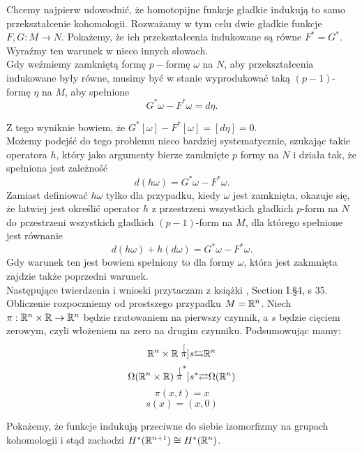 \documentclass[licencjacka]{pracamgr}
\theoremstyle{definition}
\theoremstyle{definition}
\theoremstyle{plain}
\theoremstyle{plain}
\theoremstyle{plain}
\def\R{\ensuremath\mathbb{R}}
\begin{document}
Chcemy najpierw udowodnić, że homotopijne funkcje gładkie indukują to samo
przekształcenie kohomologii.  Rozważamy w tym celu dwie gładkie funkcje $F, G:
M \rightarrow N$.  Pokażemy, że ich przekształcenia indukowane są równe
$F^\ast = G^\ast$. Wyraźmy ten warunek w nieco innych słowach. \\

Gdy weźmiemy zamkniętą formę $p-$formę $\omega$ na $N$, aby
przekształcenia indukowane były równe, musimy być w stanie
wyprodukować taką $(p-1)$-formę $\eta$ na $M$, aby spełnione
\[
    G^\ast \omega - F^\ast \omega = d\eta.
\]

Z tego wyniknie bowiem, że
$ G^\ast [\omega] - F^\ast [\omega] =
[d\eta] = 0$. \\

Możemy podejść do tego problemu nieco bardziej systematycznie, 
szukając takie operatora
$h$, który jako argumenty bierze zamknięte $p$ formy na $N$
i działa tak, że spełniona jest zależność
\[
    d(h\omega) = G^\ast \omega - F^\ast \omega.
\] 
Zamiast definiować $h \omega$ tylko dla przypadku, kiedy $\omega$
jest zamknięta, okazuje się, że łatwiej jest określić operator
$h$ z przestrzeni wszystkich gładkich $p$-form na $N$
do przestrzeni wszystkich gładkich $(p-1)$-form na $M$,
dla którego spełnione jest równanie
\[
    d(h\omega) + h(d\omega) = G^\ast \omega - F^\ast \omega.
\]
Gdy warunek ten jest bowiem spełniony to dla formy $\omega$, która
jest zakmnięta zajdzie także poprzedni warunek. \\

Następujące twierdzenia i wnioski przytaczam z książki \cite{bott}, Section
I.\S4, s 35. \\

Obliczenie rozpoczniemy od prostszego przypadku $M = \R^n$.
Niech $\pi: \R^n \times \R \rightarrow \R^n$  będzie rzutowaniem
na pierwszy czynnik, a $s$  będzie cięciem zerowym, czyli włożeniem
na zero na drugim czynniku. Podsumowując mamy:
\[
 \R^n \times \R
 \stackrel[\pi]{s}{\leftrightarrows} 
 \R^n
\]
\[
 \Omega (\R^n \times \R)
 \stackrel[\pi^\ast]{s^\ast}{\rightleftarrows} 
 \Omega(\R^n)
\]
\[
    \pi(x, t) = x
\]
\[
    s(x) = (x, 0)
\]

Pokażemy, że funkcje indukują przeciwne do siebie izomorfizmy na
grupach kohomologii i stąd zachodzi $H^\ast(\R^{n+1}) \cong H^\ast(\R^{n})$. \\
\end{document}
